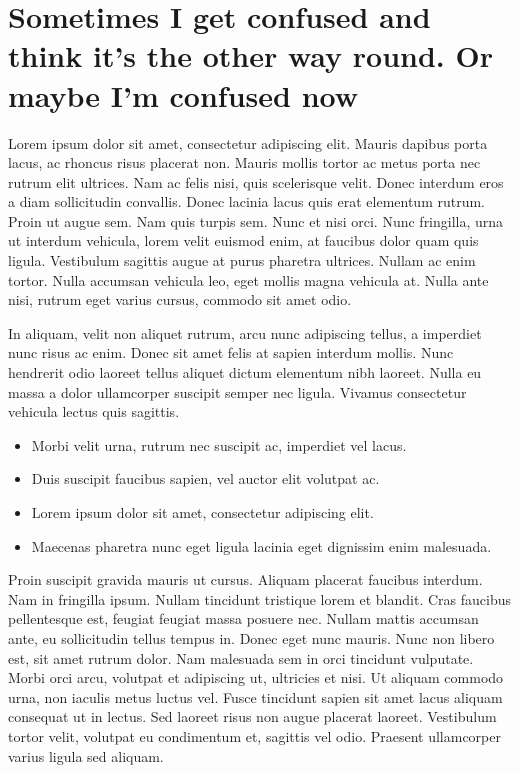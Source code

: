 \documentclass{article}
\begin{document}
\section{Sometimes I get confused and think it's the other way round. Or maybe I'm confused now}\hypertarget{sometimes-i-get-confused-and-think-its-the-other-way-round-or-maybe-im-confused-now}{}\label{sometimes-i-get-confused-and-think-its-the-other-way-round-or-maybe-im-confused-now}

Lorem ipsum dolor sit amet, consectetur adipiscing elit. Mauris dapibus porta lacus, ac rhoncus risus placerat non. Mauris mollis tortor ac metus porta nec rutrum elit ultrices. Nam ac felis nisi, quis scelerisque velit. Donec interdum eros a diam sollicitudin convallis. Donec lacinia lacus quis erat elementum rutrum. Proin ut augue sem. Nam quis turpis sem. Nunc et nisi orci. Nunc fringilla, urna ut interdum vehicula, lorem velit euismod enim, at faucibus dolor quam quis ligula. Vestibulum sagittis augue at purus pharetra ultrices. Nullam ac enim tortor. Nulla accumsan vehicula leo, eget mollis magna vehicula at. Nulla ante nisi, rutrum eget varius cursus, commodo sit amet odio.

In aliquam, velit non aliquet rutrum, arcu nunc adipiscing tellus, a imperdiet nunc risus ac enim. Donec sit amet felis at sapien interdum mollis. Nunc hendrerit odio laoreet tellus aliquet dictum elementum nibh laoreet. Nulla eu massa a dolor ullamcorper suscipit semper nec ligula. Vivamus consectetur vehicula lectus quis sagittis.

\begin{itemize}
\item Morbi velit urna, rutrum nec suscipit ac, imperdiet vel lacus.
\item Duis suscipit faucibus sapien, vel auctor elit volutpat ac.
\item Lorem ipsum dolor sit amet, consectetur adipiscing elit.
\item Maecenas pharetra nunc eget ligula lacinia eget dignissim enim malesuada.
\end{itemize}

Proin suscipit gravida mauris ut cursus. Aliquam placerat faucibus interdum. Nam in fringilla ipsum. Nullam tincidunt tristique lorem et blandit. Cras faucibus pellentesque est, feugiat feugiat massa posuere nec. Nullam mattis accumsan ante, eu sollicitudin tellus tempus in. Donec eget nunc mauris. Nunc non libero est, sit amet rutrum dolor. Nam malesuada sem in orci tincidunt vulputate. Morbi orci arcu, volutpat et adipiscing ut, ultricies et nisi. Ut aliquam commodo urna, non iaculis metus luctus vel. Fusce tincidunt sapien sit amet lacus aliquam consequat ut in lectus. Sed laoreet risus non augue placerat laoreet. Vestibulum tortor velit, volutpat eu condimentum et, sagittis vel odio. Praesent ullamcorper varius ligula sed aliquam.
\end{document}
